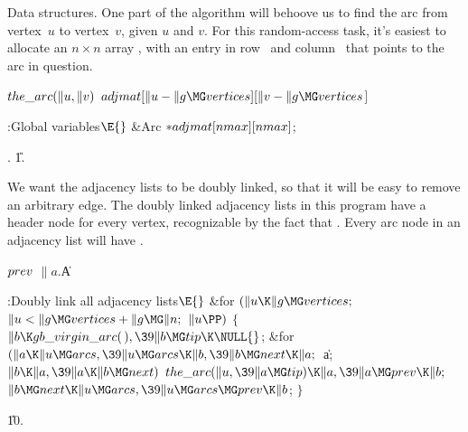 Data structures. One part of the algorithm will behoove us
to find the arc from
vertex~$u$ to vertex~$v$, given $u$ and $v$. For this random-access
task, it's easiest
to allocate an $n\times n$ array , with an entry in row~
and column~ that points to the arc in question.

\Y\B\4\D$\\{the\_arc}(\|u,\|v)$ \5
$\\{adjmat}[\|u-\|g\MG\\{vertices}][\|v-\|g\MG\\{vertices}{}$]\par
\Y\B\4:Global variables\X${}\E{}$\6
\&{Arc} ${}{*}\\{adjmat}[\\{nmax}][\\{nmax}]{}$;\par
{}.
\U1.\fi

We want the adjacency lists to be doubly linked, so that
it will be easy to remove an arbitrary edge. The doubly linked adjacency
lists in this program have a header node  for every
vertex,
recognizable by the fact that . Every arc node  in
an adjacency list will have .

\Y\B\4\D$\\{prev}$ \5
$\|a.{}$\|A\par
\Y\B\4:Doubly link all adjacency lists\X${}\E{}$\6
\&{for} ${}(\|u\K\|g\MG\\{vertices};{}$ ${}\|u<\|g\MG\\{vertices}+\|g\MG\|n;{}$
${}\|u\PP){}$\5
${}\{{}$\1\6
${}\|b\K\\{gb\_virgin\_arc}(\,),\39\|b\MG\\{tip}\K\NULL{}$;\6
\&{for} ${}(\|a\K\|u\MG\\{arcs},\39\|u\MG\\{arcs}\K\|b,\39\|b\MG\\{next}\K%
\|a;{}$ \|a; ${}\|b\K\|a,\39\|a\K\|b\MG\\{next}){}$\1\5
${}\\{the\_arc}(\|u,\39\|a\MG\\{tip})\K\|a,\39\|a\MG\\{prev}\K\|b;{}$\2\6
${}\|b\MG\\{next}\K\|u\MG\\{arcs},\39\|u\MG\\{arcs}\MG\\{prev}\K\|b{}$;\6
\4${}\}{}$\2\par
\U10.\fi

